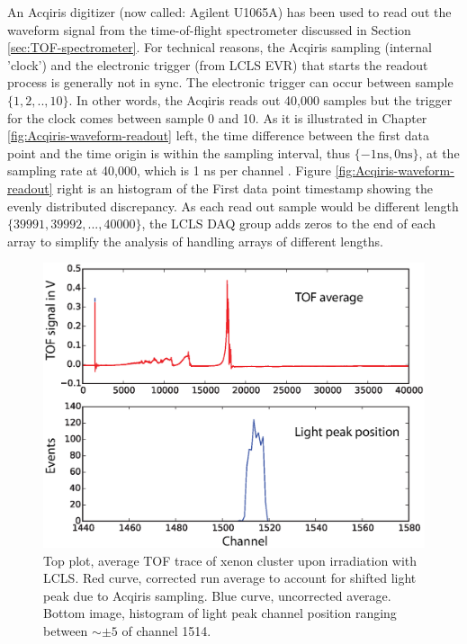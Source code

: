 An Acqiris digitizer (now called: Agilent U1065A) has been used to read out the waveform signal from the time-of-flight spectrometer discussed in Section \ref{sec:TOF-spectrometer}. For technical reasons, the Acqiris sampling (internal 'clock') and the electronic trigger (from LCLS EVR) that starts the readout process is generally not in sync. The electronic trigger can occur between sample $\{1,2,..,10\}$. In other words, the Acqiris reads out 40,000 samples but the trigger for the clock comes between sample 0 and 10. As it is illustrated in Chapter \ref{fig:Acqiris-waveform-readout} left, the time difference between the first data point and the time origin is within the sampling interval, thus $\{-1 \text{ns}, 0 \text{ns}\}$, at the sampling rate at 40,000, which is 1 ns per channel \citep{Acqiris-manual}. Figure \ref{fig:Acqiris-waveform-readout} right is an histogram of the First data point timestamp showing the evenly distributed discrepancy. As each read out sample would be different length $\{39991,39992,...,40000\}$, the LCLS DAQ group adds zeros to the end of each array to simplify the analysis of handling arrays of different lengths.\\
\begin{figure}
	\centering
		\includegraphics[width=1.00\textwidth]{images/TOF-trace-light-peak.eps}
	\caption[Using light peak to find absolute time zero in Acqiris traces.]{Top plot, average TOF trace of xenon cluster upon irradiation with LCLS. Red curve, corrected run average to account for shifted light peak due to Acqiris sampling. Blue curve, uncorrected average. Bottom image, histogram of light peak channel position ranging between $\sim\pm 5$ of channel 1514.}
	\label{fig:TOF-trace-light-peak}
\end{figure}
